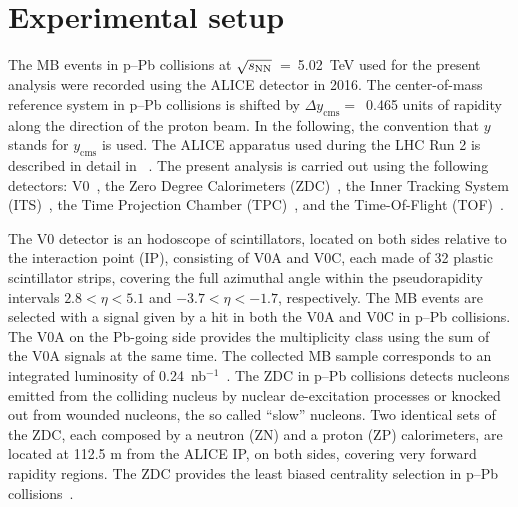 \section{Experimental setup}
\label{sec:setup}
The MB events in p--Pb collisions at $\sqrt{s_{\rm NN}}$~=~5.02~TeV used for the present analysis were recorded using the ALICE detector in 2016. The center-of-mass reference system in p--Pb collisions is shifted by $\Delta y_{\mathrm{cms}} =$~0.465 units of rapidity along the direction of the proton beam. In the following, the convention that $y$ stands for $y_{\mathrm{cms}}$ is used. The ALICE apparatus used during the LHC Run 2 is described in detail in ~\cite{Abelev:2014ffa}. The present analysis is carried out using the following detectors: V0~\cite{ALICE:2013axi}, the Zero Degree Calorimeters (ZDC)~\cite{Cortese:2019nnv}, the Inner Tracking System (ITS)~\cite{ALICE:2010tia}, the Time Projection Chamber (TPC)~\cite{Alme:2010ke}, and the Time-Of-Flight (TOF)~\cite{Jacazio:2018slq}. 

The V0 detector is an hodoscope of scintillators, located on both sides relative to the interaction point (IP), consisting of V0A and V0C, each made of 32 plastic scintillator strips, covering the full azimuthal angle within the pseudorapidity intervals $2.8 < \eta < 5.1$ and $-3.7 < \eta < -1.7$, respectively. The MB events are selected with a signal given by a hit in both the V0A and V0C in p--Pb collisions. The V0A on the Pb-going side provides the multiplicity class using the sum of the V0A signals at the same time. The collected MB sample corresponds to an integrated luminosity of 0.24~nb$^{-1}$~\cite{ALICE:2014gvw}. The ZDC in p--Pb collisions detects nucleons emitted from the colliding nucleus by nuclear de-excitation processes or knocked out from wounded nucleons, the so called “slow” nucleons. Two identical sets of the ZDC, each composed by a neutron (ZN) and a proton (ZP) calorimeters, are located at 112.5 m from the ALICE IP, on both sides, covering very forward rapidity regions. The ZDC provides the least biased centrality selection in p--Pb collisions~\cite{ALICE:2014xsp}.

